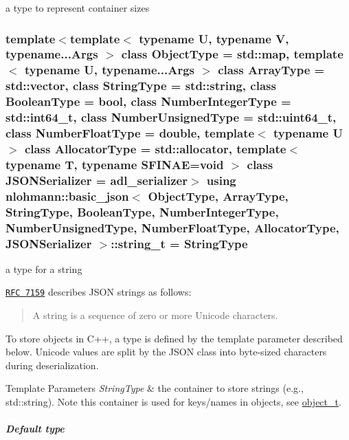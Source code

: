 a type to represent container sizes 

\subsubsection[{\texorpdfstring{string\+\_\+t}{string_t}}]{\setlength{\rightskip}{0pt plus 5cm}template$<$template$<$ typename U, typename V, typename...\+Args $>$ class Object\+Type = std\+::map, template$<$ typename U, typename...\+Args $>$ class Array\+Type = std\+::vector, class String\+Type  = std\+::string, class Boolean\+Type  = bool, class Number\+Integer\+Type  = std\+::int64\+\_\+t, class Number\+Unsigned\+Type  = std\+::uint64\+\_\+t, class Number\+Float\+Type  = double, template$<$ typename U $>$ class Allocator\+Type = std\+::allocator, template$<$ typename T, typename S\+F\+I\+N\+A\+E=void $>$ class J\+S\+O\+N\+Serializer = adl\+\_\+serializer$>$ using {\bf nlohmann\+::basic\+\_\+json}$<$ Object\+Type, Array\+Type, String\+Type, Boolean\+Type, Number\+Integer\+Type, Number\+Unsigned\+Type, Number\+Float\+Type, Allocator\+Type, J\+S\+O\+N\+Serializer $>$\+::{\bf string\+\_\+t} =  String\+Type}\hypertarget{classnlohmann_1_1basic__json_a61f8566a1a85a424c7266fb531dca005}{}\label{classnlohmann_1_1basic__json_a61f8566a1a85a424c7266fb531dca005}


a type for a string 

\href{http://rfc7159.net/rfc7159}{\tt R\+FC 7159} describes J\+S\+ON strings as follows\+: \begin{quote}
A string is a sequence of zero or more Unicode characters. \end{quote}


To store objects in C++, a type is defined by the template parameter described below. Unicode values are split by the J\+S\+ON class into byte-\/sized characters during deserialization.


\begin{DoxyTemplParams}{Template Parameters}
{\em String\+Type} & the container to store strings (e.\+g., {\ttfamily std\+::string}). Note this container is used for keys/names in objects, see \hyperlink{classnlohmann_1_1basic__json_a0322396ca5cd4623bc816bf735377623}{object\+\_\+t}.\\
\hline
\end{DoxyTemplParams}
\subparagraph*{Default type}

